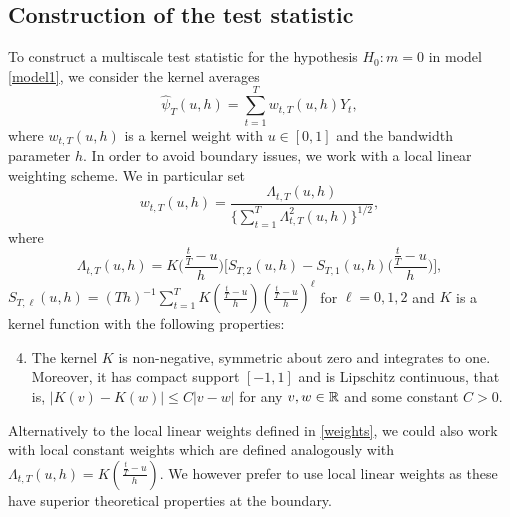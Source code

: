 \subsection{Construction of the test statistic}\label{subsec-method-stat}


To construct a multiscale test statistic for the hypothesis $H_0: m = 0$ in model \eqref{model1}, we consider the kernel averages
\begin{equation*}
\widehat{\psi}_T(u,h) = \sum\limits_{t=1}^T w_{t,T}(u,h) Y_t, 
\end{equation*}
where $w_{t,T}(u,h)$ is a kernel weight with $u \in [0,1]$ and the bandwidth parameter $h$. In order to avoid boundary issues, we work with a local linear weighting scheme. We in particular set 
\begin{equation}\label{weights}
w_{t,T}(u,h) = \frac{\Lambda_{t,T}(u,h)}{ \{\sum\nolimits_{t=1}^T \Lambda_{t,T}^2(u,h)\}^{1/2} }, 
\end{equation}
where
\[ \Lambda_{t,T}(u,h) = K\Big(\frac{\frac{t}{T}-u}{h}\Big) \Big[ S_{T,2}(u,h) - S_{T,1}(u,h) \Big(\frac{\frac{t}{T}-u}{h}\Big) \Big], \]
$S_{T,\ell}(u,h) = (Th)^{-1} \sum\nolimits_{t=1}^T K(\frac{\frac{t}{T}-u}{h}) (\frac{\frac{t}{T}-u}{h})^\ell$ for $\ell = 0,1,2$ and $K$ is a kernel function with the following properties:  
\begin{enumerate}[label=(C\arabic*),leftmargin=1.05cm]
\setcounter{enumi}{3}
\item \label{C-ker} The kernel $K$ is non-negative, symmetric about zero and integrates to one. Moreover, it has compact support $[-1,1]$ and is Lipschitz continuous, that is, $|K(v) - K(w)| \le C |v-w|$ for any $v,w \in \mathbb{R}$ and some constant $C > 0$. 
\end{enumerate} 
Alternatively to the local linear weights defined in \eqref{weights}, we could also work with local constant weights which are defined analogously with $\Lambda_{t,T}(u,h) = K(\frac{\frac{t}{T}-u}{h})$. We however prefer to use local linear weights as these have superior theoretical properties at the boundary.  


